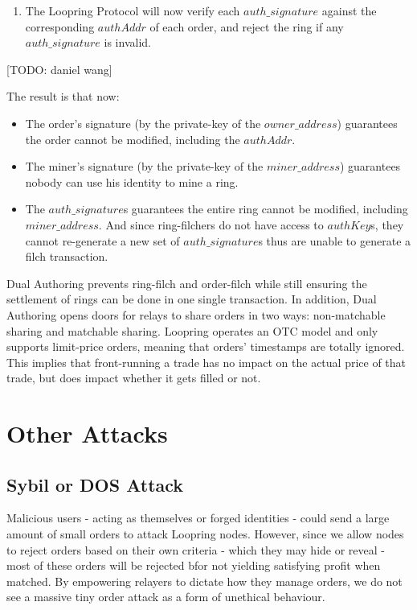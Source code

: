 \documentclass[UTF8,nofonts]{article}
\begin{document}
\begin{multicols}{2}
\begin{enumerate}
	\item The Loopring Protocol will now verify each $auth\_signature$ against the corresponding $authAddr$ of each order, and reject the ring if any $auth\_signature$ is invalid.
 
\end{enumerate}
[TODO: daniel wang]


The result is that now:

\begin{itemize}

	\item  The order’s signature (by the private-key of the $owner\_address$) guarantees the order cannot be modified, including the $authAddr$.
	\item  The miner’s signature (by the private-key of the $miner\_address$) guarantees nobody can use his identity to mine a ring.
	\item  The $auth\_signature$s guarantees the entire ring cannot be modified, including $miner\_address$. And since ring-filchers do not have access to $authKey$s, they cannot re-generate a new set of $auth\_signature$s thus are unable to generate a filch transaction.

\end{itemize}

Dual Authoring prevents ring-filch and order-filch while still ensuring the settlement of rings can be done in one single transaction. In addition, Dual Authoring opens doors for relays to share orders in two ways: non-matchable sharing and matchable sharing. Loopring operates an OTC model and only supports limit-price orders, meaning that orders’ timestamps are totally ignored. This implies that front-running a trade has no impact on the actual price of that trade, but does impact whether it gets filled or not.

\section{Other Attacks}

\subsection{Sybil or DOS Attack}
Malicious users - acting as themselves or forged identities - could send a large amount of small orders to attack Loopring nodes. However, since we allow nodes to reject orders based on their own criteria - which they may hide or reveal - most of these orders will be rejected bfor not yielding satisfying profit when matched.  By empowering relayers to dictate how they manage orders, we do not see a massive tiny order attack as a form of unethical behaviour.


\end{multicols}
\end{document}

